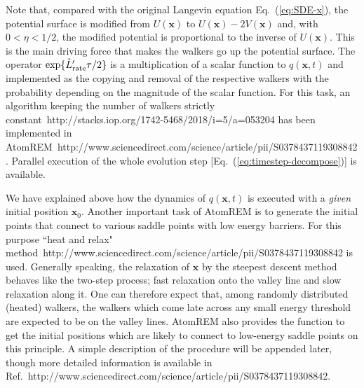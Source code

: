 \documentclass[preprint,12pt]{elsarticle}
\begin{document}
Note that, compared with the original Langevin equation Eq.~(\ref{eq:SDE-x}), the potential surface is modified from $U({\bm x})$ to $U({\bm x})-2V({\bm x})$ and, with $0<\eta<1/2$, the modified potential is proportional to the inverse of $U({\bm x})$. This is the main driving force that makes the walkers go up the potential surface. The operator ${\rm exp}\{\hat{L}'_{\rm rate} \tau/2\}$ is a multiplication of a scalar function to $q({\bm x}, t)$ and implemented as the copying and removal of the respective walkers with the probability depending on the magnitude of the scalar function. For this task, an algorithm keeping the number of walkers strictly constant~http://stacks.iop.org/1742-5468/2018/i=5/a=053204 has been implemented in AtomREM~http://www.sciencedirect.com/science/article/pii/S0378437119308842. Parallel execution of the whole evolution step [Eq.~(\ref{eq:timestep-decompose})] is available.

We have explained above how the dynamics of $q({\bm x}, t)$ is executed with a {\it given} initial position ${\bm x}_{0}$. Another important task of AtomREM is to generate the initial points that connect to various saddle points with low energy barriers. For this purpose ``heat and relax" method~http://www.sciencedirect.com/science/article/pii/S0378437119308842 is used. Generally speaking, the relaxation of ${\bm x}$ by the steepest descent method behaves like the two-step process; fast relaxation onto the valley line and slow relaxation along it. One can therefore expect that, among randomly distributed (heated) walkers, the walkers which come late across any small energy threshold are expected to be on the valley lines. AtomREM also provides the function to get the initial positions which are likely to connect to low-energy saddle points on this principle. A simple description of the procedure will be appended later, though more detailed information is available in Ref.~http://www.sciencedirect.com/science/article/pii/S0378437119308842.



\end{document}
